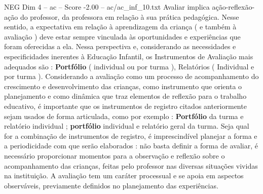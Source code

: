 \begin{textsample}{NEG Dim 4 – ac – Score -2.00 – ac/ac\_inf\_10.txt}
Avaliar implica ação-reflexão-ação do professor, da professora em relação à sua prática pedagógica.
Nesse sentido, a expectativa em relação à aprendizagem da criança ( e também à avaliação ) deve estar sempre vinculada às oportunidades e experiências que foram oferecidas a ela.
Nessa perspectiva e, considerando as necessidades e especificidades inerentes à Educação Infantil, os Instrumentos de Avaliação mais adequados são : \textbf{Portfólio} ( individual ou por turma ), Relatórios ( Individual e por turma ).
Considerando a avaliação como um processo de acompanhamento do crescimento e desenvolvimento das crianças, como instrumento que orienta o planejamento e como dinâmica que traz elementos de reflexão para o trabalho educativo, é importante que os instrumentos de registro citados anteriormente sejam usados de forma articulada, como por exemplo : \textbf{Portfólio} da turma e relatório individual ; \textbf{portfólio} individual e relatório geral da turma.
Seja qual for a combinação de instrumentos de registro, é imprescindível planejar a forma e a periodicidade com que serão elaborados : não basta definir a forma de avaliar, é necessário proporcionar momentos para a observação e reflexão sobre o acompanhamento das crianças, feitas pelo professor nas diversas situações vividas na instituição.
A avaliação tem um caráter processual e se apoia em aspectos observáveis, previamente definidos no planejamento das experiências.

\end{textsample}
